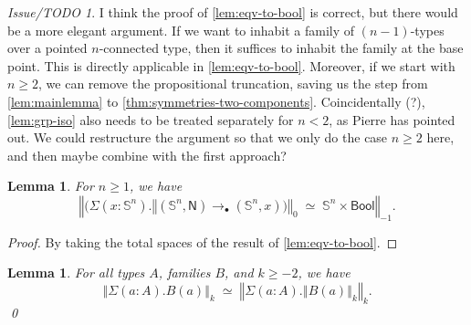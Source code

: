 \documentclass[11pt,a4paper,oneside,reqno]{amsart}
\newtheorem{lemma}[theorem]{Lemma}
\theoremstyle{definition}
\theoremstyle{remark}
\newtheorem{issue}[theorem]{Issue/TODO}
\newcommand{\sph}[1]{{\mathbb S}^{#1}}
\newcommand{\trunc}[2]{\mathopen{}\left\Vert #2\right\Vert_{#1}\mathclose{}}
\newcommand{\North}{\mathsf N}
\begin{document}
\begin{issue}
 I think the proof of \cref{lem:eqv-to-bool} is correct, but there would be a more elegant argument.
 If we want to inhabit a family of $(n-1)$-types over a pointed $n$-connected type, then it suffices to inhabit the family at the base point. This is directly applicable in \cref{lem:eqv-to-bool}. Moreover, if we start with $n \geq 2$, we can remove the propositional truncation, saving us the step from \cref{lem:mainlemma} to \cref{thm:symmetries-two-components}.
 Coincidentally (?), \cref{lem:grp-iso} also needs to be treated separately for $n < 2$, as Pierre has pointed out.
 We could restructure the argument so that we only do the case $n \geq 2$ here, and then maybe combine with the first approach?
\end{issue}


\begin{lemma} \label{lem:sn-bool}
 For $n \geq 1$, we have
 \begin{equation}
  \trunc {-1} {\big(\Sigma (x : \sph n). \trunc 0 {(\sph n , \North) \to_\bullet (\sph n, x)\big)} \; \simeq \; \sph n \times \mathsf{Bool}}.
 \end{equation}
\end{lemma}
\begin{proof}
 By taking the total spaces of the result of \cref{lem:eqv-to-bool}.
\end{proof}

\begin{lemma} \label{lem:rm-truncs}
 For all types $A$, families $B$, and $k \geq -2$, we have
 \begin{equation}
  \trunc k {\Sigma (a : A). B(a)} \; \simeq \; \trunc k {\Sigma (a : A). \trunc k {B(a)}}.
 \end{equation}
 \qed
\end{lemma}
\end{document}

